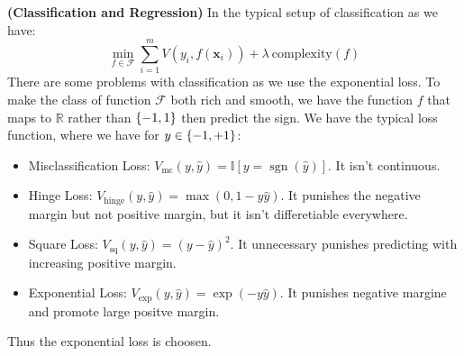 \begin{remark}{\textbf{(Classification and Regression)}}
    In the typical setup of classification as we have:
    \begin{equation*}
        \min_{f\in\mathcal{F}} \sum^m_{i=1}V(y_i, f(\boldsymbol x_i)) + \lambda \ \text{complexity}(f)
    \end{equation*}
    There are some problems with classification as we use the exponential loss. To make the class of function $\mathcal{F}$ both rich and smooth, we have the function $f$ that maps to $\mathbb{R}$ rather than $\left\{ -1, 1 \right\}$ then predict the sign. We have the typical loss function, where we have for $y \in \left\{ -1, +1 \right\}$:
    \begin{itemize}
        \item Misclassification Loss: $V_\text{mc}(y, \hat{y}) = \mathbb{I}[y = \operatorname{sgn}(\hat{y})]$. It isn't continuous.
        \item Hinge Loss: $V_\text{hinge}(y, \hat{y}) = \max(0, 1-y\hat{y})$. It punishes the negative margin but not positive margin, but it isn't differetiable everywhere.
        \item Square Loss: $V_\text{sq}(y, \hat{y}) = (y-\hat{y})^2$. It unnecessary punishes predicting with increasing positive margin.
        \item Exponential Loss: $V_\text{exp}(y, \hat{y}) = \exp(-y\hat{y})$. It punishes negative margine and promote large positve margin.
    \end{itemize}
    Thus the exponential loss is choosen.
\end{remark}

